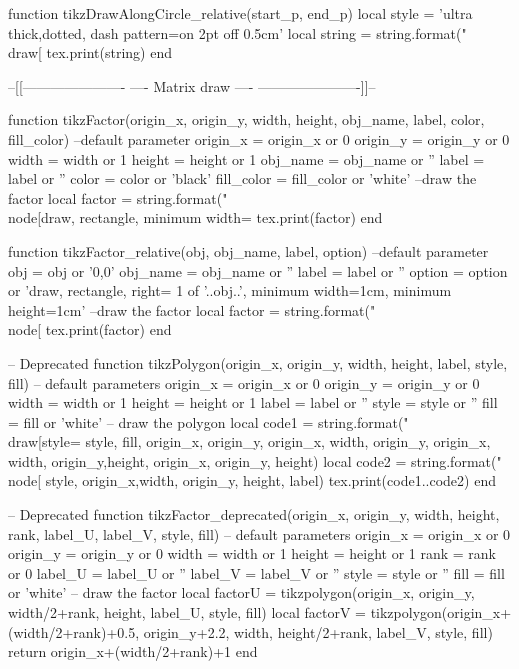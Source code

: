 \begin{luacode*}
	function tikzDrawAlongCircle_relative(start_p, end_p)
	  local style = 'ultra thick,dotted, dash pattern=on 2pt off 0.5cm'
	  local string = string.format("\\draw[%
	  tex.print(string)
	end
  
	--[[----------------------
	----    Matrix draw   ----
	----------------------]]--
  
	function tikzFactor(origin_x, origin_y, width, height, obj_name, label, color, fill_color)
	  --default parameter
	  origin_x = origin_x or 0
	  origin_y = origin_y or 0
	  width = width or 1
	  height = height or 1
	  obj_name = obj_name or ''
	  label = label or ''
	  color = color or 'black'
	  fill_color = fill_color or 'white'
	  --draw the factor
	  local factor = string.format("\\node[draw, rectangle, minimum width=%
	  tex.print(factor)
	end
  
	function tikzFactor_relative(obj, obj_name, label, option)
	  --default parameter
	  obj = obj or '0,0'
	  obj_name = obj_name or ''
	  label = label or ''
	  option = option or 'draw, rectangle, right= 1 of '..obj..', minimum width=1cm, minimum height=1cm'
	  --draw the factor
	  local factor = string.format("\\node[%
	  tex.print(factor)
	end
  
	-- Deprecated
	function tikzPolygon(origin_x, origin_y, width, height, label, style, fill)
	-- default parameters
	origin_x = origin_x or 0
	origin_y = origin_y or 0
	width = width or 1
	height = height or 1
	label = label or ''
	style = style or ''
	fill = fill or 'white'
	-- draw the polygon
	local code1 = string.format("\\draw[style=%
	style, fill, origin_x, origin_y, origin_x, width, origin_y, origin_x, width,
	origin_y,height, origin_x, origin_y, height)
	local code2 = string.format("\\node[%
	style, origin_x,width, origin_y, height, label)
	tex.print(code1..code2)
	end
  
	-- Deprecated
	function tikzFactor_deprecated(origin_x, origin_y, width, height, rank, label_U,
	label_V, style, fill)
	-- default parameters
	origin_x = origin_x or 0
	origin_y = origin_y or 0
	width = width or 1
	height = height or 1
	rank = rank or 0
	label_U = label_U or ''
	label_V = label_V or ''
	style = style or ''
	fill = fill or 'white'
	-- draw the factor
	local factorU = tikzpolygon(origin_x, origin_y, width/2+rank, height, label_U,
	style, fill)
	local factorV = tikzpolygon(origin_x+(width/2+rank)+0.5, origin_y+2.2, width,
	height/2+rank, label_V, style, fill)
	return origin_x+(width/2+rank)+1
	end
  

\end{luacode*}

